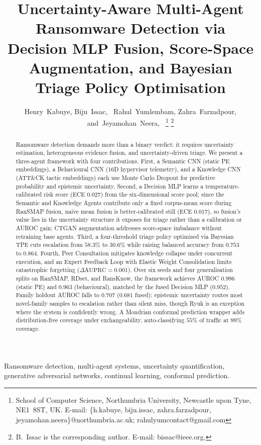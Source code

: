 \documentclass[journal]{IEEEtran}
\title{Uncertainty-Aware Multi-Agent Ransomware Detection via
       Decision MLP Fusion, Score-Space Augmentation, and
       Bayesian Triage Policy Optimisation}
\author{Henry~Kabuye\IEEEauthorrefmark{1},
        Biju~Issac\IEEEauthorrefmark{1},~\IEEEmembership{Senior~Member,~IEEE,}
        Rahul~Yumlembam\IEEEauthorrefmark{1},
        Zahra~Farzadpour\IEEEauthorrefmark{1},
        and~Jeyamohan~Neera\IEEEauthorrefmark{1},~\IEEEmembership{Member,~IEEE}%
\thanks{\IEEEauthorrefmark{1} School of Computer Science,
Northumbria University, Newcastle upon Tyne, NE1~8ST, UK\@.
E-mail: \{h.kabuye, biju.issac, zahra.farzadpour, jeyamohan.neera\}@northumbria.ac.uk; rahulyumcontact@gmail.com}%
\thanks{B.~Issac is the corresponding author.
E-mail: bissac@ieee.org.}%
}
\begin{document}
\maketitle

\begin{abstract}
Ransomware detection demands more than a binary verdict: it requires
uncertainty estimation, heterogeneous evidence fusion, and
uncertainty-driven triage. We present a three-agent framework with four
contributions. First, a Semantic CNN (static PE embeddings), a
Behavioural CNN (16D hypervisor telemetry), and a Knowledge CNN (ATT\&CK
tactic embeddings) each use Monte Carlo Dropout for predictive
probability and epistemic uncertainty. Second, a Decision MLP learns a
temperature-calibrated risk score (ECE $0.027$) from the six-dimensional
score pool; since the Semantic and Knowledge Agents contribute only a
fixed corpus-mean score during RanSMAP fusion, naive mean fusion is
better-calibrated still (ECE $0.017$), so fusion's value lies in the
uncertainty structure it exposes for triage rather than a calibration or
AUROC gain; CTGAN augmentation addresses score-space imbalance without
retraining base agents. Third, a four-threshold triage policy optimised
via Bayesian TPE cuts escalation from $58.3\%$ to $30.6\%$ while raising
balanced accuracy from $0.753$ to $0.864$. Fourth, Peer Consultation mitigates
knowledge collapse under concurrent execution, and an Expert Feedback Loop
with Elastic Weight Consolidation limits catastrophic forgetting
($\Delta\text{AUPRC}{=}0.001$). Over six seeds and four generalisation splits on
RanSMAP, RDset, and RansKnow, the framework achieves AUROC $0.996$ (static
PE) and $0.963$ (behavioural), matched by the fused Decision MLP ($0.952$).
Family holdout AUROC falls to $0.707$ ($0.681$ fused): epistemic uncertainty
routes most novel-family samples to escalation rather than silent miss,
though Ryuk is an exception where the system is confidently wrong. A
Mondrian conformal prediction wrapper adds distribution-free coverage
under exchangeability, auto-classifying $55\%$ of traffic at $99\%$ coverage.
\end{abstract}

\begin{IEEEkeywords}
Ransomware detection, multi-agent systems, uncertainty quantification,
generative adversarial networks, continual learning, conformal prediction.
\end{IEEEkeywords}

\end{document}

